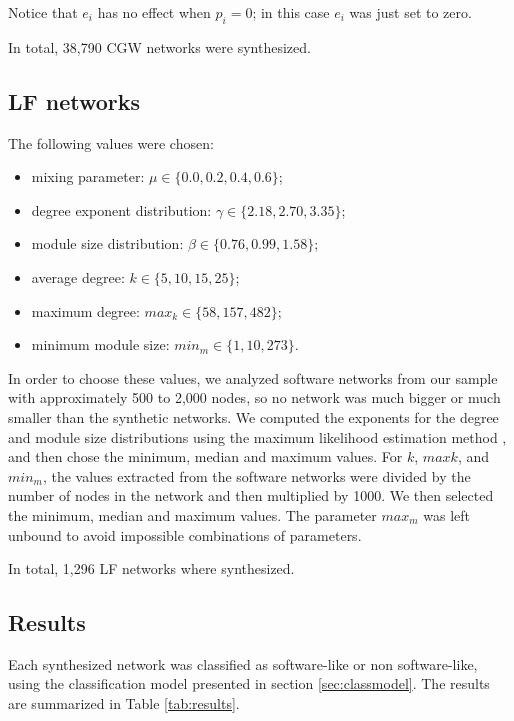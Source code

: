 Notice that $e_i$ has no effect when $p_i = 0$; in this case $e_i$ was just set
to zero.

In total, 38,790 CGW networks were synthesized.

\subsection{LF networks}

The following values were chosen:

\begin{itemize}
  \item mixing parameter: $\mu \in \{0.0, 0.2, 0.4, 0.6\}$;
  \item degree exponent distribution: $\gamma \in \{2.18, 2.70, 3.35\}$;
  \item module size distribution: $\beta \in \{0.76, 0.99, 1.58\}$;
  \item average degree: $k \in \{5, 10, 15, 25\}$;
  \item maximum degree: $max_k \in \{58, 157, 482\}$;
  \item minimum module size: $min_m \in \{1, 10, 273\}$.
\end{itemize}

In order to choose these values, we analyzed software networks from our sample
with approximately 500 to 2,000 nodes, so no network was much bigger or much
smaller than the synthetic networks. We computed the exponents for the degree
and module size distributions using the maximum likelihood estimation method
\cite{Clauset2007}, and then chose the minimum, median and maximum values. For
$k$, $maxk$, and $min_m$, the values extracted from the software networks were
divided by the number of nodes in the network and then multiplied by 1000. We
then selected the minimum, median and maximum values. The parameter $max_m$ was
left unbound to avoid impossible combinations of parameters.

In total, 1,296 LF networks where synthesized.

\subsection{Results}

Each synthesized network was classified as software-like or non software-like,
using the classification model presented in section \ref{sec:classmodel}. The
results are summarized in Table \ref{tab:results}. 

